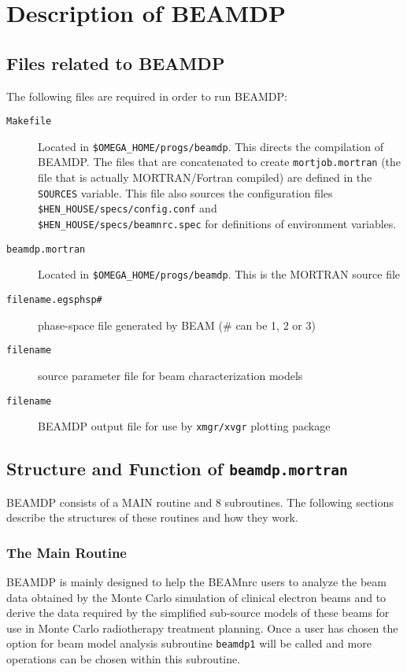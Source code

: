 \documentclass[12pt,twoside]{article}
\begin{document}
\section{Description of BEAMDP}
\subsection{Files related to BEAMDP}

The following files are required in order to run BEAMDP:
\begin{description}
\item [{\tt Makefile}] Located in {\tt \$OMEGA\_HOME/progs/beamdp}.
This directs the compilation of BEAMDP.  The files that are concatenated
to create {\tt mortjob.mortran} (the file that is actually MORTRAN/Fortran
compiled) are defined in the {\tt SOURCES} variable.  This file also
sources the configuration files {\tt \$HEN\_HOUSE/specs/config.conf}
and \\
{\tt \$HEN\_HOUSE/specs/beamnrc.spec} for definitions of environment
variables.
\item [{\tt beamdp.mortran}] Located in {\tt \$OMEGA\_HOME/progs/beamdp}.
This is the MORTRAN source file
\item [{\tt filename.egsphsp\#}] phase-space file generated by BEAM (\# can be 1, 2 or 3)
\item [{\tt filename}] source parameter file for beam characterization models
\item [{\tt filename}] BEAMDP output file for use by {\tt xmgr/xvgr} plotting package
\end{description}

\subsection{Structure and Function of {\tt beamdp.mortran}}

BEAMDP consists of a MAIN routine and 8 subroutines. The following sections describe the structures of these routines and how they work.

\subsubsection{The Main Routine}
BEAMDP is mainly designed to help the BEAMnrc users to analyze the beam data
obtained by the Monte Carlo simulation of clinical electron beams and to derive the data required by the simplified sub-source models of these beams for use in Monte Carlo radiotherapy treatment planning. Once a user has chosen the option for beam model analysis subroutine {\tt beamdp1} will be called and more operations can be chosen within this subroutine.
\end{document}
